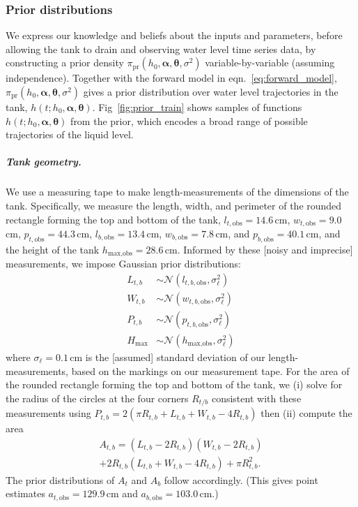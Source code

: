 \documentclass[a4paper,fleqn]{cas-dc}
\newcommand\themodel {$h(t; h_0, \boldsymbol \alpha, \boldsymbol\theta)$\xspace}
\begin{document}
\subsubsection{Prior distributions} 
We express our knowledge and beliefs about the inputs and parameters, before allowing the tank to drain and observing water level time series data, by constructing a prior density $\pi_{\text{pr}}(h_0, \boldsymbol \alpha, \boldsymbol \theta, \sigma^2)$ variable-by-variable (assuming independence). Together with the forward model in eqn.~\ref{eq:forward_model}, $\pi_{\text{pr}}(h_0, \boldsymbol \alpha, \boldsymbol \theta, \sigma^2)$ gives a prior distribution over water level trajectories in the tank, \themodel. 
Fig~\ref{fig:prior_train} shows samples of functions \themodel from the prior, which encodes a broad range of possible trajectories of the liquid level. 

\subparagraph{Tank geometry.} We use a measuring tape to make length-measurements of the dimensions of the tank.
Specifically, we measure the length, width, and perimeter of the rounded rectangle forming the top and bottom of the tank,
$l_{t, \text{obs}}=14.6$\,cm, $w_{t, \text{obs}}=9.0$\,cm, $p_{t, \text{obs}}=44.3$\,cm,
$l_{b, \text{obs}}=13.4$\,cm, $w_{b, \text{obs}}=7.8$\,cm, and $p_{b, \text{obs}}=40.1$\,cm, and the height of the tank $h_{\text{max}, \text{obs}}=28.6$\,cm.
Informed by these [noisy and imprecise] measurements, we impose Gaussian prior distributions:
\begin{align}
L_{t,b} &\sim \mathcal{N}(l_{t,b, \text{obs}}, \sigma_\ell^2) \\
W_{t,b} &\sim \mathcal{N}(w_{t,b, \text{obs}}, \sigma_\ell^2) \\
P_{t,b} &\sim \mathcal{N}(p_{t,b, \text{obs}}, \sigma_\ell^2) \\
H_{\text{max}} &\sim \mathcal{N}(h_{\text{max}, \text{obs}}, \sigma_\ell^2)
\end{align}
where $\sigma_\ell=0.1$\,cm is the [assumed] standard deviation of our length-measurements, based on the markings on our measurement tape. 
For the area of the rounded rectangle forming the top and bottom of the tank,
we (i) solve for the radius of the circles at the four corners $R_{t/b}$ consistent with these measurements using $P_{t,b}=2(\pi R_{t,b} + L_{t,b}+W_{t,b}-4R_{t,b})$ then (ii) compute the area \cite{rounded_rect}
\begin{multline}
	A_{t,b}= (L_{t,b}-2R_{t,b})(W_{t,b}-2R_{t,b}) \\ + 2R_{t,b} (L_{t,b}+W_{t,b} -4R_{t,b}) + \pi R_{t,b}^2.
\end{multline}
The prior distributions of $A_t$ and $A_b$ follow accordingly. 
(This gives point estimates $a_{t, \text{obs}}=129.9$\,cm and $a_{b, \text{obs}}=103.0$\,cm.)
\end{document}
